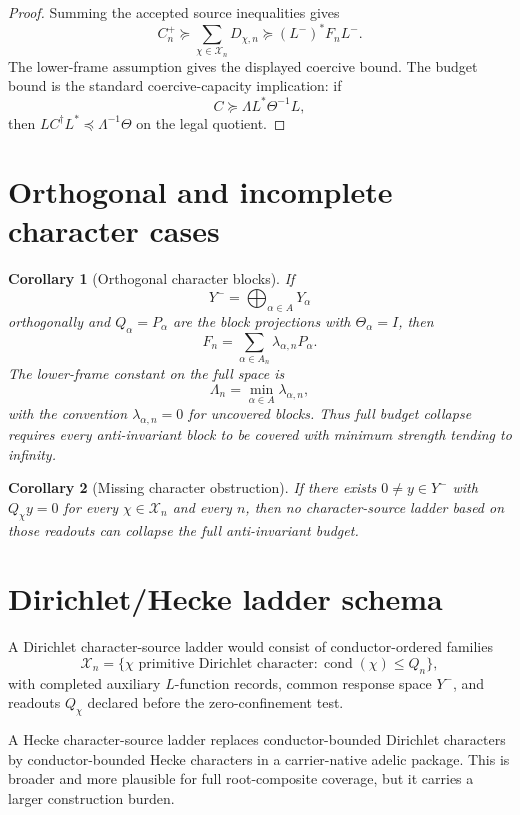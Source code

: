 \documentclass[11pt]{article}
\newtheorem{corollary}{Corollary}
\begin{document}
\begin{proof}
Summing the accepted source inequalities gives
\[
  C_n^+\succeq \sum_{\chi\in\mathcal X_n}D_{\chi,n}
  \succeq (L^-)^*F_nL^-.
\]
The lower-frame assumption gives the displayed coercive bound.  The budget bound is the standard coercive-capacity implication: if
\[
  C\succeq \Lambda L^*\Theta^{-1}L,
\]
then $LC^\dagger L^*\preceq \Lambda^{-1}\Theta$ on the legal quotient.
\end{proof}

\section{Orthogonal and incomplete character cases}
\begin{corollary}[Orthogonal character blocks]
If
\[
  Y^- = \bigoplus_{\alpha\in A}Y_\alpha
\]
orthogonally and $Q_\alpha=P_\alpha$ are the block projections with $\Theta_\alpha=I$, then
\[
  F_n=\sum_{\alpha\in A_n}\lambda_{\alpha,n}P_\alpha.
\]
The lower-frame constant on the full space is
\[
  \Lambda_n=\min_{\alpha\in A}\lambda_{\alpha,n},
\]
with the convention $\lambda_{\alpha,n}=0$ for uncovered blocks.  Thus full budget collapse requires every anti-invariant block to be covered with minimum strength tending to infinity.
\end{corollary}

\begin{corollary}[Missing character obstruction]
If there exists $0\ne y\in Y^-$ with $Q_\chi y=0$ for every $\chi\in\mathcal X_n$ and every $n$, then no character-source ladder based on those readouts can collapse the full anti-invariant budget.
\end{corollary}

\section{Dirichlet/Hecke ladder schema}
A Dirichlet character-source ladder would consist of conductor-ordered families
\[
  \mathcal X_n=\{\chi\text{ primitive Dirichlet character}:\operatorname{cond}(\chi)\le Q_n\},
\]
with completed auxiliary $L$-function records, common response space $Y^-$, and readouts $Q_\chi$ declared before the zero-confinement test.

A Hecke character-source ladder replaces conductor-bounded Dirichlet characters by conductor-bounded Hecke characters in a carrier-native adelic package.  This is broader and more plausible for full root-composite coverage, but it carries a larger construction burden.
\end{document}
